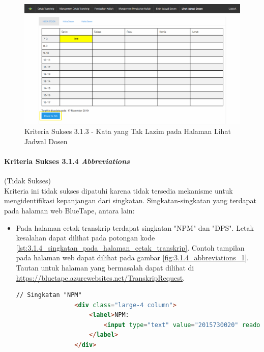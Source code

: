 \documentclass[a4paper,twoside]{article}
\begin{document}
\begin{enumerate}
\begin{itemize}
			\begin{figure}[H]
				\centering  
				\includegraphics[scale=0.3, frame]{kriteria-sukses-3-1-3-unusual-words-3}  
				\caption[Kriteria Sukses 3.1.3 - Kata yang Tak Lazim pada Halaman Lihat Jadwal Dosen]{Kriteria Sukses 3.1.3 - Kata yang Tak Lazim pada Halaman Lihat Jadwal Dosen}
				\label{fig:3.1.3_unusual_words_3}  
			\end{figure}
			
		\end{itemize}

		\paragraph{Kriteria Sukses 3.1.4 \textit{Abbreviations}}
		\label{par:kepatuhan_bluetape_kriteria_sukses_3.1.4}
		(Tidak Sukses)\\

		Kriteria ini tidak sukses dipatuhi karena tidak tersedia mekanisme untuk mengidentifikasi kepanjangan dari singkatan. Singkatan-singkatan yang terdapat pada halaman web BlueTape, antara lain:

		\begin{itemize}
			\item Pada halaman cetak transkrip terdapat singkatan "NPM" dan "DPS". Letak kesalahan dapat dilihat pada potongan kode \ref{lst:3.1.4_singkatan_pada_halaman_cetak_transkrip}. Contoh tampilan pada halaman web dapat dilihat pada gambar \ref{fig:3.1.4_abbreviations_1}. Tautan untuk halaman yang bermasalah dapat dilihat di \url{https://bluetape.azurewebsites.net/TranskripRequest}.
			\begin{lstlisting}[frame=single, label={lst:3.1.4_singkatan_pada_halaman_cetak_transkrip}, language=HTML, caption=Kriteria Sukses 3.1.4 - Singkatan pada Halaman Cetak Transkrip]
				// Singkatan "NPM"
				<div class="large-4 column">
					<label>NPM:
						<input type="text" value="2015730020" readonly="readonly"/>
					</label>
				</div>
				

\end{lstlisting}
\end{itemize}
\end{enumerate}
\end{document}
